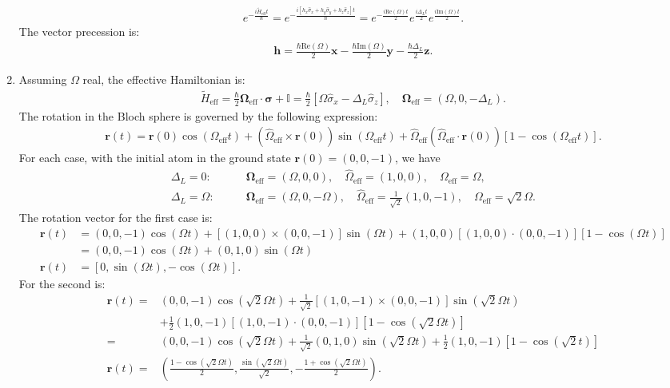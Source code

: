 \documentclass[letterpaper,11pt,twoside]{article}
\newcommand{\re}[1]{\text{Re}\left(#1\right)}
\newcommand{\im}[1]{\text{Im}\left(#1\right)}
\newcommand{\br}{\bm{r}}
\newcommand{\bh}{\bm{h}}
\newcommand{\hsigma}{\hat{\sigma}}
\begin{document}
\begin{enumerate}[itemsep=0pt,topsep=0pt,parsep=0pt,label=\alph*)]
\begin{align*}
    e^{-\frac{i\tilde{H}_{\mathrm{eff}}t}{\hbar}}=e^{-\frac{i[h_x\hsigma_x+h_y\hsigma_y+h_z\hsigma_z]t}{\hbar}}=e^{-\frac{i\re{\Omega}t}{2}}e^{\frac{i\Delta_Lt}{2}}e^{\frac{i\im{\Omega}t}{2}}.
  \end{align*}
  The vector precession is:
  \begin{align*}
    \bh=\frac{\hbar\re{\Omega}}{2}\bm{x}-\frac{\hbar\im{\Omega}}{2}\bm{y}-\frac{\hbar\Delta_L}{2}\bm{z}.
  \end{align*}
  \item Assuming $\Omega$ real, the effective Hamiltonian is:
  \begin{align*}
    \tilde{H}_{\mathrm{eff}}=\frac{\hbar}{2}\bm{\Omega}_{\mathrm{eff}}\cdot\bm{\sigma}+\mathds{I}=\frac{\hbar}{2}\left[\Omega\hsigma_x-\Delta_L\hsigma_z\right],\quad\bm{\Omega}_{\mathrm{eff}}=(\Omega,0,-\Delta_L).
  \end{align*}
  The rotation in the Bloch sphere is governed by the following expression:
  \begin{align*}
    \br(t)=\br(0)\cos(\Omega_{\mathrm{eff}}t)+(\hat{\Omega}_{\mathrm{eff}}\times\br(0))\sin(\Omega_{\mathrm{eff}}t)+\hat{\Omega}_{\mathrm{eff}}
    (\hat{\Omega}_{\mathrm{eff}}\cdot\br(0))[1-\cos(\Omega_{\mathrm{eff}}t)].
  \end{align*}
  For each case, with the initial atom in the ground state $\br(0)=(0,0,-1)$, we have 
  \begin{align*}
    \Delta_L=0:&\qquad\bm{\Omega}_{\mathrm{eff}}=(\Omega,0,0),\quad\hat{\Omega}_{\mathrm{eff}}=(1,0,0),\quad\Omega_{\mathrm{eff}}=\Omega,\\
    \Delta_L=\Omega:&\qquad\bm{\Omega}_{\mathrm{eff}}=(\Omega,0,-\Omega),\quad\hat{\Omega}_{\mathrm{eff}}=\frac{1}{\sqrt{2}}(1,0,-1),\quad\Omega_{\mathrm{eff}}=\sqrt{2}\Omega.
  \end{align*}
  The rotation vector for the first case is:
  \begin{align*}
    \br(t)&=(0,0,-1)\cos(\Omega t)+[(1,0,0)\times(0,0,-1)]\sin(\Omega t)+(1,0,0)[(1,0,0)\cdot(0,0,-1)][1-\cos(\Omega t)]\\
    &=(0,0,-1)\cos(\Omega t)+(0,1,0)\sin(\Omega t)\\
    \br(t)&=[0,\sin(\Omega t),-\cos(\Omega t)].
  \end{align*}
  For the second is:
  \begin{align*}
    \br(t)=&(0,0,-1)\cos(\sqrt{2}\Omega t)+\frac{1}{\sqrt{2}}[(1,0,-1)\times(0,0,-1)]\sin(\sqrt{2}\Omega t)\\
    &+\frac{1}{2}(1,0,-1)[(1,0,-1)\cdot(0,0,-1)][1-\cos(\sqrt{2}\Omega t)]\\
    =&(0,0,-1)\cos(\sqrt{2}\Omega t)+\frac{1}{\sqrt{2}}(0,1,0)\sin(\sqrt{2}\Omega t)+\frac{1}{2}(1,0,-1)[1-\cos(\sqrt{2}t)]\\
    \br(t)=&\left(\frac{1-\cos(\sqrt{2}\Omega t)}{2},\frac{\sin(\sqrt{2}\Omega t)}{\sqrt{2}},-\frac{1+\cos(\sqrt{2}\Omega t)}{2}\right).
  \end{align*}
\end{enumerate}
\end{document}

